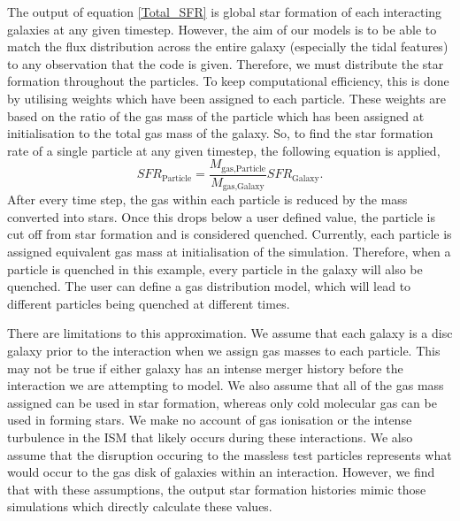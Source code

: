 The output of equation \ref{Total_SFR} is global star formation of each interacting galaxies at any given timestep. However, the aim of our models is to be able to match the flux distribution across the entire galaxy (especially the tidal features) to any observation that the code is given. Therefore, we must distribute the star formation throughout the particles. To keep computational efficiency, this is done by utilising weights which have been assigned to each particle. These weights are based on the ratio of the gas mass of the particle which has been assigned at initialisation to the total gas mass of the galaxy. So, to find the star formation rate of a single particle at any given timestep, the following equation is applied,
\begin{equation}
    SFR_{\text{Particle}} = \frac{M_{\text{gas,Particle}}}{M_{\text{gas,Galaxy}}}SFR_{\text{Galaxy}}.
\end{equation}
After every time step, the gas within each particle is reduced by the mass converted into stars. Once this drops below a user defined value, the particle is cut off from star formation and is considered quenched. Currently, each particle is assigned equivalent gas mass at initialisation of the simulation. Therefore, when a particle is quenched in this example, every particle in the galaxy will also be quenched. The user can define a gas distribution model, which will lead to different particles being quenched at different times.

There are limitations to this approximation. We assume that each galaxy is a disc galaxy prior to the interaction when we assign gas masses to each particle. This may not be true if either galaxy has an intense merger history before the interaction we are attempting to model. We also assume that all of the gas mass assigned can be used in star formation, whereas only cold molecular gas can be used in forming stars. We make no account of gas ionisation or the intense turbulence in the ISM that likely occurs during these interactions. We also assume that the disruption occuring to the massless test particles represents what would occur to the gas disk of galaxies within an interaction. However, we find that with these assumptions, the output star formation histories mimic those simulations which directly calculate these values. 

